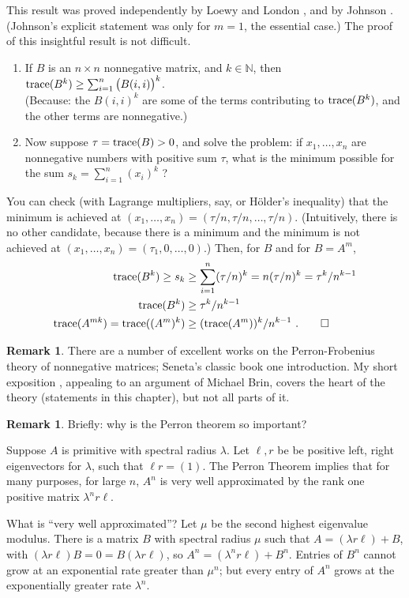 \documentclass{amsart}
\newcommand{\ai}{\index[authors]}
\theoremstyle{definition}
\newtheorem{rem}[equation]{Remark}
\theoremstyle{definition}
\newcommand{\N}{\mathbb N}
\newcommand{\tr}{\textnormal{trace}}
\numberwithin{equation}{subsection}
\begin{document}
This result was proved independently
by
Loewy and London \cite{LoewyLondon}, and
by  Johnson\ai{Johnson, Charles}
\cite{Johnson1981}. (Johnson's\ai{Johnson, Charles}  explicit statement was only
for $m=1$, the essential case.)
The proof of this insightful
result is not difficult.
\begin{enumerate}
\item If $B$ is an $n\times n$  nonnegative matrix, and $k\in \N$,
then $\tr (B^k) \geq \sum_{i=1}^n \big(B(i,i)\big)^k$. \\
(Because: the  $B(i,i)^k $ are some of the terms contributing to
$\tr (B^k)$, and the other terms are nonnegative.)
\item Now  suppose $\tau = \tr (B) >0$, and
solve the  problem: if $x_1, \dots, x_n$
are nonnegative numbers with positive sum $\tau$, what is the minimum possible
for the sum $s_k= \sum_{i=1}^n (x_i)^k$ ?
\end{enumerate}
You can check (with Lagrange multipliers, say, or
H\"{o}lder's inequality) that the minimum is achieved
at $(x_1, \dots , x_n)=(\tau /n, \tau /n, \dots , \tau /n)$.
(Intuitively, there is no other candidate,
because there is a minimum and the minimum is not achieved at $(x_1, \dots , x_n)
=(\tau_1, 0, \dots , 0)$.)
Then, for $B$ and for $B=A^m$,
\begin{align*}
\tr (B^k) \geq s_k & \geq \sum_{i=1}^n (\tau/n)^k
= n (\tau/n)^k  = \tau^k / n^{k-1}  \\
\tr (B^k)  & \geq  \tau^k / n^{k-1} \\
\tr (A^{mk}) =\tr ((A^m)^k)    & \geq  (\tr (A^m))^k/n^{k-1} \ .  \qed
\end{align*}

\begin{rem}\label{pfnotes}
There are a number of excellent works on
the Perron-Frobenius theory of nonnegative matrices;
Seneta's classic book
\cite{SenetaBook2006}%
one introduction.
My short exposition
\cite{boylepfnotes},%
appealing
  to an argument of Michael Brin,\ai{Brin, Michael} covers the
  heart of the theory (statements
  in this chapter), but not all parts of it.
\end{rem}


\begin{rem}                  \label{whyperron}
Briefly: why is the Perron theorem so important?

Suppose $A$ is primitive with
spectral radius $\lambda$. Let $  \ell, r$ be
be positive  left, right
eigenvectors for $\lambda$, such that
$\ell r = (1)$.
The Perron Theorem implies that for
many purposes, for large $n$,  $A^n$ is very
well approximated by the rank one positive matrix
$\lambda^n r\ell$.

What is ``very well approximated''?
Let $\mu $ be the second highest
eigenvalue modulus.
There is a matrix $B$ with spectral radius $\mu$
such that $A = (\lambda r\ell) + B$,
with $(\lambda r\ell) B =0 = B(\lambda r\ell)$, so
$A^n = (\lambda^n r\ell) + B^n$.
Entries of  $B^n$ cannot grow at an exponential rate greater than
$\mu^n$; but every entry of $A^n $ grows
at the exponentially greater rate  $\lambda^n$.
\end{rem}
\end{document}
